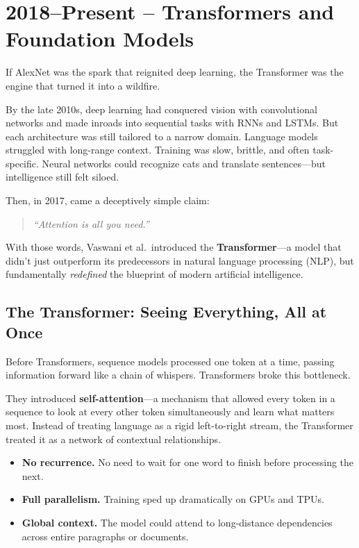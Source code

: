 \section{2018–Present – Transformers and Foundation Models}

If AlexNet was the spark that reignited deep learning, the Transformer was the engine that turned it into a wildfire.

By the late 2010s, deep learning had conquered vision with convolutional networks and made inroads into sequential tasks with RNNs and LSTMs. But each architecture was still tailored to a narrow domain. Language models struggled with long-range context. Training was slow, brittle, and often task-specific. Neural networks could recognize cats and translate sentences—but intelligence still felt siloed.

Then, in 2017, came a deceptively simple claim:  
\begin{quote}
\textit{“Attention is all you need.”}
\end{quote}

With those words, Vaswani et al.\ introduced the \textbf{Transformer}—a model that didn’t just outperform its predecessors in natural language processing (NLP), but fundamentally \textit{redefined} the blueprint of modern artificial intelligence.

\subsection{The Transformer: Seeing Everything, All at Once}

Before Transformers, sequence models processed one token at a time, passing information forward like a chain of whispers. Transformers broke this bottleneck.

They introduced \textbf{self-attention}—a mechanism that allowed every token in a sequence to look at every other token simultaneously and learn what matters most. Instead of treating language as a rigid left-to-right stream, the Transformer treated it as a network of contextual relationships.

\begin{itemize}
  \item \textbf{No recurrence.} No need to wait for one word to finish before processing the next.
  \item \textbf{Full parallelism.} Training sped up dramatically on GPUs and TPUs.
  \item \textbf{Global context.} The model could attend to long-distance dependencies across entire paragraphs or documents.
\end{itemize}


